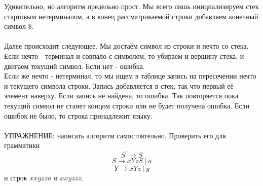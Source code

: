 \documentclass{article}
\begin{document}
Удивительно, но алгоритм предельно прост. Мы всего лишь инициализируем 
стек стартовым нетерминалом, а в конец рассматриваемой строки добавляем
конечный символ \$.\\\\
Далее происходит следующее. Мы достаём символ из строки и нечто со стека.
Если нечто - терминал и совпало с символом, то убираем и вершину стека, 
и двигаем текущий символ. Если нет - ошибка.\\
Если же нечто - нетерминал, то мы ищем в таблице запись на пересечении
нечто и текущего символа строки. Запись добавляется в стек, так что 
первый её элемент наверху. Если запись не найдена, то ошибка.
Так повторяется пока текущий символ не станет концом строки или не 
будет получена ошибка. Если ошибок не было, то строка принадлежит языку.
\\\\
УПРАЖНЕНИЕ: написать алгоритм самостоятельно. Проверить его для 
грамматики 
$$S^{'} \to S$$
$$S \to xYzS \ | \ a$$
$$Y \to xYz \ | \ y$$
и строк $xxyzza$ и $xxyzzz$.
\end{document}
